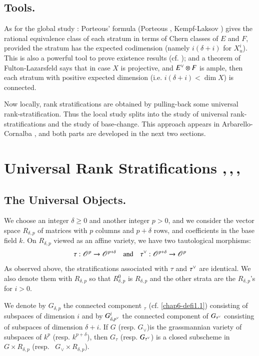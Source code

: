 \subsection{Tools.}\label{chap6-sec1.3}

As for the global study : Porteous' formula (Porteous \cite{chap6-P},
Kempf-Laksov \cite{chap6-Kel}) gives the rational equivalence class of
each stratum in terms of Chern classes of $E$ and $F$, provided the
stratum has the expected codimension (namely $i(\delta+i)$ for
$X^{i}_{u}$). This is also a powerful tool to prove existence results
(cf. \cite{chap6-K1L}); and a theorem of
Fulton-Lazarsfeld \cite{chap6-FL} says that in case $X$ is projective,
and $E\spcheck \otimes F$ is ample, then each stratum with positive
expected dimension (i.e. $i(\delta+i)<\dim X$) is connected.

Now locally, rank stratifications are obtained by pulling-back some
universal rank-stratification. Thus the local study splits into the
study of universal rank-stratifications and the study of
base-change. This approach appears in
Arbarello-Cornalba \cite{chap6-AC1}, and both parts are developed in
the next two sections.

\section{Universal Rank
Stratifications {\fontsize{13pt}{15pt}\selectfont\texorpdfstring{\cite{chap6-AC1},\,\cite{chap6-K},\,\cite{chap6-K},\,\cite{chap6-HaT1}}{Cite}}}\label{chap6-sec2}\pageoriginale

\subsection{The Universal Objects.}\label{chap6-sec2.1}

We choose an integer $\delta\geq 0$ and another integer $p>0$, and we
consider the vector space $R_{\delta,p}$ of matrices with $p$ columns
and $p+\delta$ rows, and coefficients in the base field $k$. On
$R_{\delta,p}$ viewed as an affine variety, we have two tautological
morphisms: 
$$
\tau:\mathscr{O}^{p}\to \mathscr{O}^{p+\delta}\quad\text{and}\quad \tau\spcheck
: \mathscr{O}^{p+\delta}\to \mathscr{O}^{p} 
$$
As observed above, the stratifications associated with $\tau$ and
$\tau\spcheck$ are identical. We also denote them with $R_{\delta,p}$
so that $R^{0}_{\delta,p}$ is $R_{\delta,p}$ and the other strata are
the $R_{\delta,p}$'s for $i>0$.

We denote by $G_{\delta,p}$ the connected component \qquad $_{\tau}$
(cf. \ref{chap6-defi1.1}) consisting of subspaces of dimension $i$ and
by $G^{i}_{\delta,p\spcheck}$ the connected component of
$G_{\tau\spcheck}$ consisting of subspaces of dimension $\delta+i$. If
$G$ (resp. $G_{\vee}$)is the grassmannian variety of subspaces of
$k^{p}$ (resp. $k^{p+\delta}$), then $G_{\tau}$
(resp. $G_{\tau\spcheck}$) is a closed subscheme in $G\times
R_{\delta,p}$ (resp.~ $G_{\vee}\times R_{\delta,p}$).

